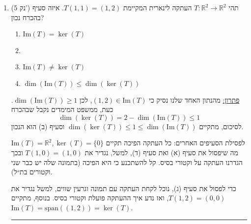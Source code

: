 \documentclass[12pt, a4paper]{article}
\newcommand{\rr}{\mathbb{R}}
\newcommand{\im}{\mathrm{Im}}
\newcommand{\points}[1]{(#1 נק') }
\begin{document}
\begin{enumerate}
$\dim(N(A))+\dim(Row(A))=3$,
אז לא יכול להיות שאלו יהיו שווים כי אז המימד שלהם יהיה 
$1.5$,
מה שלא ייתכן.
נשים לב כי בסעיף (ד) וגם בסעיף (א) אנו מעוניינים בחישוב הדטרמיננטה של המטריצה, לכן נחשב אותה
$$\det(A)=a\cdot \det\begin{pmatrix}
    a&1\\0&a\\
\end{pmatrix}-1\cdot\begin{pmatrix}
    0&1\\1&a\\
\end{pmatrix}=a^3+1$$
מכאן ניתן לראות כי עבור
$a=-1$
מתקיים
$\det(A)=0$
אז
$A$
אינה הפיכה,
מה שפוסל את סעיף (א),
וגם כי
$\det(A)=(-2)^3+1=-26\neq0$
עבור
$a=-3$,
לכן סעיף (ד) נכון. על הדרך נשים לב כי עבור
$a=0$
מתקיים
$\det(A)/eq0$
לכן
$A$
הפיכה ואז
$\mathrm{rank}(A)=3\neq2$
לכן סעיף (ב) לא נכון.

\noindent\rule{\textwidth-30pt}{0.4pt}

\newpage

\item\points{5}
תהי $T:\rr^2\to \rr^2$ העתקה לינארית המקיימת
$T(1,1) = (1,2)$.
איזה סעיף בהכרח נכון?
\begin{enumerate}
\item $\im(T)=\ker(T)$
\item
\boxed{\text{$\dim(\im(T))\geq \dim(\ker(T))$}}
\item $\im(T)\neq \ker(T)$
\item $\dim(\im(T))\leq \dim(\ker(T))$
\end{enumerate}

\underline{פתרון:}
מהנתון האחד שלנו נסיק כי
$(1,2)\in\im(T)$,
לכן
$\dim(\im(T))\ge1$.
כעת, ממשפט המימדים נקבל שבהכרח
$$\dim(\ker(T))=2-\dim(\im(T))\le 1$$
לסיכום, מתקיים
$\dim(\ker(T))\le 1\le \dim(\im(T))$
וסעיף (ב) הוא הנכון.

לפסילת הסעיפים האחרים: כל העתקה הפיכה תקיים
$\im(T)=\rr^2, \ker(T)=\{0\}$
מה שיפסול את סעיף (א) ואת סעיף (ד), למשל, נגדיר את
$T(1,0)=(1,0)$
ובכך הגדרנו העתקה על וקטורי בסיס. קל להשתכנע כי היא הפיכה (בתמונה שלה יש כבר שני וקטורים בת״ל).

כדי
לפסול את סעיף (ג), נוכל לקחת העתקה עם תמונה וגרעין שווים, למשל נגדיר את 
$T(1,2)=(0,0)$,
ואז נדע איך ההעתקה פועלת וקטורי בסיס. בנוסף, מתקיים
$\im(T)=\mathrm{span}((1,2))=\ker(T)$.

\noindent\rule{\textwidth-30pt}{0.4pt}




\end{enumerate}
\end{document}

